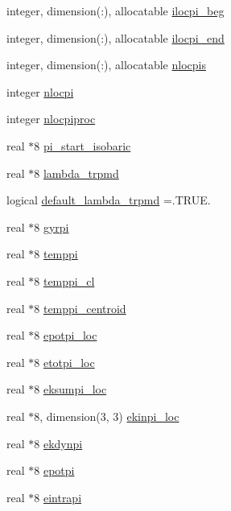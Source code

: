 \begin{DoxyCompactItemize}
\item 
integer, dimension(\-:), allocatable \hyperlink{classbeads_a901a3bc633365aca7062d140a758bed2}{ilocpi\-\_\-beg}
\item 
integer, dimension(\-:), allocatable \hyperlink{classbeads_a1c58398ef2bd90b96fbfbe11a26c7b00}{ilocpi\-\_\-end}
\item 
integer, dimension(\-:), allocatable \hyperlink{classbeads_a10684bb3dabed29b62dd83a49c559e1f}{nlocpis}
\item 
integer \hyperlink{classbeads_abbd73555d2a46563cbb9c68d402dc8cf}{nlocpi}
\item 
integer \hyperlink{classbeads_a8d39e6ac2200cc21168d9e751abef466}{nlocpiproc}
\item 
real $\ast$8 \hyperlink{classbeads_a59d4fa81e053b17dd0c14e73973ccb3a}{pi\-\_\-start\-\_\-isobaric}
\item 
real $\ast$8 \hyperlink{classbeads_a2aa911564d0335b29226af2e3e3aac96}{lambda\-\_\-trpmd}
\item 
logical \hyperlink{classbeads_ab1c00af7003e00651eff48ddce18c3a8}{default\-\_\-lambda\-\_\-trpmd} =.T\-R\-U\-E.
\item 
real $\ast$8 \hyperlink{classbeads_a4dbbfebe3132090b108afcbb993f7a3f}{gyrpi}
\item 
real $\ast$8 \hyperlink{classbeads_a3621607c4b66d4e86c3ec09d83120d48}{temppi}
\item 
real $\ast$8 \hyperlink{classbeads_a42ae02a4bcc859289b24ad8674222326}{temppi\-\_\-cl}
\item 
real $\ast$8 \hyperlink{classbeads_adf180574f60cfa67b5fec031adb6971f}{temppi\-\_\-centroid}
\item 
real $\ast$8 \hyperlink{classbeads_abee4a239842256634947102c46707ff0}{epotpi\-\_\-loc}
\item 
real $\ast$8 \hyperlink{classbeads_a87c74fb99bcb48d84020dc5754a8b64f}{etotpi\-\_\-loc}
\item 
real $\ast$8 \hyperlink{classbeads_a8045634dfdc1798472461ae15ea811ec}{eksumpi\-\_\-loc}
\item 
real $\ast$8, dimension(3, 3) \hyperlink{classbeads_ab3b44f3e5218d7874219829843f98a88}{ekinpi\-\_\-loc}
\item 
real $\ast$8 \hyperlink{classbeads_a798e7f2de2d5bedb88e9111689df62e5}{ekdynpi}
\item 
real $\ast$8 \hyperlink{classbeads_a2d5c492895271591b3cffae5d91a797e}{epotpi}
\item 
real $\ast$8 \hyperlink{classbeads_a034d51d3942be932ca93b029134bddbe}{eintrapi}

\end{DoxyCompactItemize}
